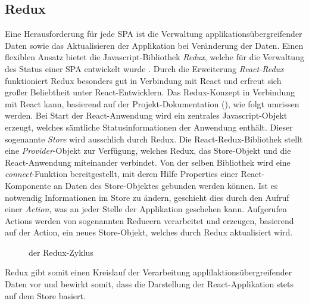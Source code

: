 \subsection{Redux}
Eine Herausforderung für jede SPA ist die Verwaltung applikationsübergreifender Daten sowie das Aktualisieren der Applikation bei Veränderung der Daten.
Einen flexiblen Ansatz bietet die Javascript-Bibliothek \emph{Redux}, welche für die Verwaltung des Status einer SPA entwickelt wurde \autocite[vgl.]{Redux:Introduction}. 
Durch die Erweiterung \emph{React-Redux} funktioniert Redux besonders gut in Verbindung mit React und erfreut sich großer Beliebtheit unter React-Entwicklern.
Das Redux-Konzept in Verbindung mit React kann, basierend auf der Projekt-Dokumentation (\cite{ReactRedux:QuickStart}), wie folgt umrissen werden. Bei Start der React-Anwendung wird ein zentrales Javascript-Objekt erzeugt, welches sämtliche Statusinformationen der Anwendung enthält. Dieser sogenannte \emph{Store} wird ausschlich durch Redux. Die React-Redux-Bibliothek stellt eine \emph{Provider}-Objekt zur Verfügung, welches Redux, das Store-Objekt und die React-Anwendung miteinander verbindet. Von der selben Bibliothek wird eine \emph{connect}-Funktion bereitgestellt, mit deren Hilfe Properties einer React-Komponente an Daten des Store-Objektes gebunden werden können. Ist es notwendig Informationen im Store zu ändern, geschieht dies durch den Aufruf einer \emph{Action}, was an jeder Stelle der Applikation geschehen kann. Aufgerufen Actions werden von sogenannten Reducern verarbeitet und erzeugen, basierend auf der Action, ein neues Store-Objekt, welches durch Redux aktualisiert wird.
\begin{figure}[H]
\centering
{}
\caption[Redux-Zyklus]{der Redux-Zyklus}
\label{figure:ReduxCycle}
\end{figure}
Redux gibt somit einen Kreislauf der Verarbeitung applilaktionsübergreifender Daten vor und bewirkt somit, dass die Darstellung der React-Applikation stets auf dem Store basiert.


